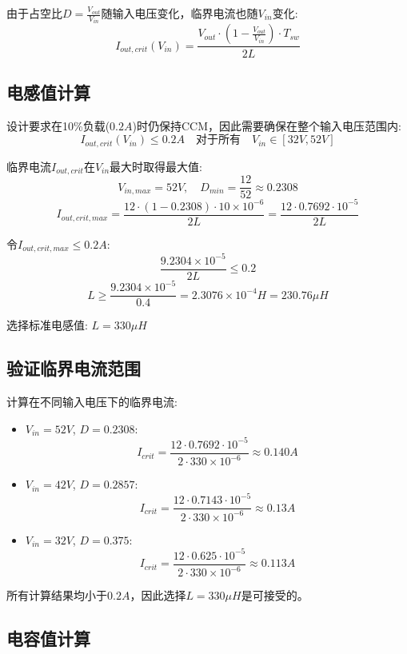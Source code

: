 \documentclass[11pt,a4paper]{ctexart}
\begin{document}
由于占空比$D = \frac{V_{out}}{V_{in}}$随输入电压变化，临界电流也随$V_{in}$变化:
\[
I_{out,crit}(V_{in}) = \frac{V_{out} \cdot \left(1-\frac{V_{out}}{V_{in}}\right) \cdot T_{sw}}{2L}
\]

\subsection{电感值计算}

设计要求在10\%负载($0.2A$)时仍保持CCM，因此需要确保在整个输入电压范围内:
\[
I_{out,crit}(V_{in}) \leq 0.2A \quad \text{对于所有} \quad V_{in} \in [32V, 52V]
\]

临界电流$I_{out,crit}$在$V_{in}$最大时取得最大值:
\[
V_{in,max} = 52V, \quad D_{min} = \frac{12}{52} \approx 0.2308
\]
\[
I_{out,crit,max} = \frac{12 \cdot (1-0.2308) \cdot 10 \times 10^{-6}}{2L} = \frac{12 \cdot 0.7692 \cdot 10^{-5}}{2L}
\]

令$I_{out,crit,max} \leq 0.2A$:
\[
\frac{9.2304 \times 10^{-5}}{2L} \leq 0.2
\]
\[
L \geq \frac{9.2304 \times 10^{-5}}{0.4} = 2.3076 \times 10^{-4} H = 230.76\mu H
\]

选择标准电感值: $L = 330\mu H $

\subsection{验证临界电流范围}

计算在不同输入电压下的临界电流:

\begin{itemize}
    \item $V_{in} = 52V$, $D = 0.2308$:
    \[
    I_{crit} = \frac{12 \cdot 0.7692 \cdot 10^{-5}}{2 \cdot 330 \times 10^{-6}} \approx 0.140A
    \]
    
    \item $V_{in} = 42V$, $D = 0.2857$:
    \[
    I_{crit} = \frac{12 \cdot 0.7143 \cdot 10^{-5}}{2 \cdot 330 \times 10^{-6}} \approx 0.13A
    \]
    
    \item $V_{in} = 32V$, $D = 0.375$:
    \[
    I_{crit} = \frac{12 \cdot 0.625 \cdot 10^{-5}}{2 \cdot 330 \times 10^{-6}} \approx 0.113A
    \]
\end{itemize}

所有计算结果均小于$0.2A$，因此选择$L = 330\mu H$是可接受的。

\subsection{电容值计算}
\end{document}
